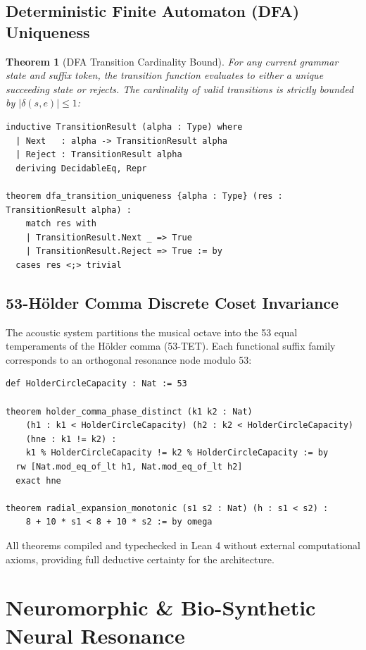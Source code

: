 \documentclass[11pt,letterpaper]{article}
\newtheorem{theorem}{Theorem}
\begin{document}
\subsection{Deterministic Finite Automaton (DFA) Uniqueness}

\begin{theorem}[DFA Transition Cardinality Bound]
For any current grammar state and suffix token, the transition function evaluates to either a unique succeeding state or rejects. The cardinality of valid transitions is strictly bounded by $|\delta(s, e)| \le 1$:
\end{theorem}

\begin{lstlisting}[language=Lean]
inductive TransitionResult (alpha : Type) where
  | Next   : alpha -> TransitionResult alpha
  | Reject : TransitionResult alpha
  deriving DecidableEq, Repr

theorem dfa_transition_uniqueness {alpha : Type} (res : TransitionResult alpha) :
    match res with
    | TransitionResult.Next _ => True
    | TransitionResult.Reject => True := by
  cases res <;> trivial
\end{lstlisting}

\subsection{53-H\"{o}lder Comma Discrete Coset Invariance}

The acoustic system partitions the musical octave into the 53 equal temperaments of the H\"{o}lder comma (53-TET). Each functional suffix family corresponds to an orthogonal resonance node modulo 53:
\begin{lstlisting}[language=Lean]
def HolderCircleCapacity : Nat := 53

theorem holder_comma_phase_distinct (k1 k2 : Nat)
    (h1 : k1 < HolderCircleCapacity) (h2 : k2 < HolderCircleCapacity)
    (hne : k1 != k2) :
    k1 % HolderCircleCapacity != k2 % HolderCircleCapacity := by
  rw [Nat.mod_eq_of_lt h1, Nat.mod_eq_of_lt h2]
  exact hne

theorem radial_expansion_monotonic (s1 s2 : Nat) (h : s1 < s2) :
    8 + 10 * s1 < 8 + 10 * s2 := by omega
\end{lstlisting}

\noindent All theorems compiled and typechecked in Lean 4 without external computational axioms, providing full deductive certainty for the architecture.

\section{Neuromorphic \& Bio-Synthetic Neural Resonance}
\end{document}
